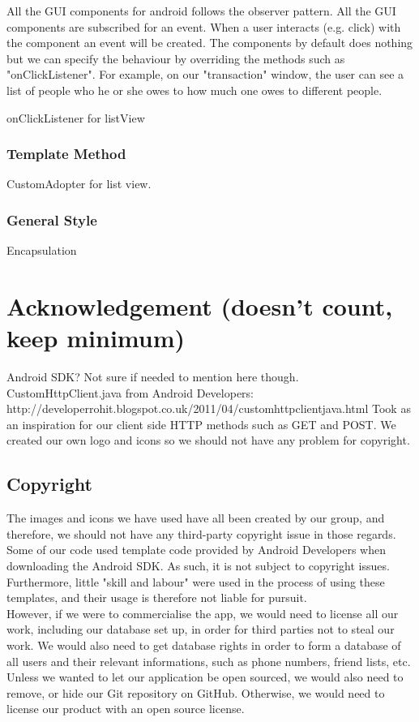 \documentclass[a4paper,11pt]{article}
\begin{document}
All the GUI components for android follows the observer pattern. All the GUI components are subscribed for an event. When a user interacts (e.g. click) with the component an event will be created. The components by default does nothing but we can specify the behaviour by overriding the methods such as "onClickListener". For example, on our "transaction" window, the user can see a list of people who he or she owes to how much one owes to different people.  

onClickListener for listView 
 
\subsubsection*{Template Method}
CustomAdopter for list view.

\subsubsection*{General Style}
Encapsulation

 
\section{Acknowledgement (doesn’t count, keep minimum)}
Android SDK? Not sure if needed to mention here though.
CustomHttpClient.java from Android Developers: http://developerrohit.blogspot.co.uk/2011/04/customhttpclientjava.html
Took as an inspiration for our client side HTTP methods such as GET and POST.
We created our own logo and icons so we should not have any problem for copyright. 

\subsection*{Copyright}
The images and icons we have used have all been created by our group, and therefore, we should not have any third-party copyright issue in those regards.
Some of our code used template code provided by Android Developers when downloading the Android SDK. As such, it is not subject to copyright issues. Furthermore, little "skill and labour" were used in the process of using these templates, and their usage is therefore not liable for pursuit.\\
However, if we were to commercialise the app, we would need to license all our work, including our database set up, in order for third parties not to steal our work. We would also need to get database rights in order to form a database of all users and their relevant informations, such as phone numbers, friend lists, etc. \\
Unless we wanted to let our application be open sourced, we would also need to remove, or hide our Git repository on GitHub. Otherwise, we would need to license our product with an open source license.
\end{document}
